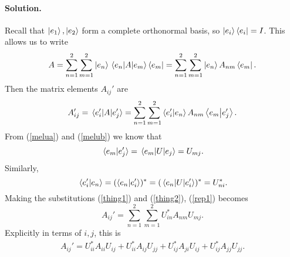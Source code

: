 \documentclass[11pt]{article}
\newcommand{\refeq}[1]{(\ref{#1})}
\newenvironment{solution}
{
    \paragraph{Solution.}
    \ignorespaces
}
{
    \bigskip
}
\begin{document}
\begin{solution}
	Recall that $\ket{e_1}, \ket{e_2}$ form a complete orthonormal basis, so $\ket{e_i}\bra{e_i} = I$.  This allows us to write
	\begin{equation}
		A = \sum_{n=1}^2 \sum_{m=1}^2 \ket{e_n} \mel{e_n}{A}{e_m} \bra{e_m} = \sum_{n=1}^2 \sum_{m=1}^2 \ket{e_n} A_{nm} \bra{e_m}.
	\end{equation}
	Then the matrix elements $A_{ij}'$ are
	\begin{equation} \label{rep1}
		A_{ij}' = \mel*{e_i'}{A}{e_j'} = \sum_{n=1}^2 \sum_{m=1}^2 \braket{e_i'}{e_n} A_{nm} \braket{e_m}{e_j'}.
	\end{equation}
	From \refeq{melua} and \refeq{melub} we know that
	\begin{equation} \label{thing1}
		\braket*{e_m}{e_j'} = \mel{e_m}{U}{e_j} = U_{mj}.
	\end{equation}
	Similarly,
	\begin{equation} \label{thing2}
		\braket*{e_i'}{e_n} = (\braket{e_n}{e_i'})^* = (\mel{e_n}{U}{e_i'})^* = U^*_{ni}.
	\end{equation}
	Making the substitutions \refeq{thing1} and \refeq{thing2}, \refeq{rep1} becomes
	\begin{equation}
		A_{ij}' = \sum_{n=1}^2 \sum_{m=1}^2 U_{in}^* A_{nm} U_{mj}.
	\end{equation}
	Explicitly in terms of $i, j$, this is
	\begin{align}
		A_{ij}' = U_{ii}^* A_{ii} U_{ij} + U_{ii}^* A_{ij} U_{jj} + U_{ij}^* A_{ji} U_{ij} + U_{ij}^* A_{jj} U_{jj}.
	\end{align}

\end{solution}
\end{document}
